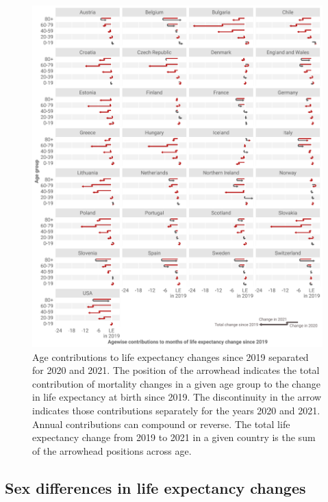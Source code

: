 \documentclass[12pt]{article}
\begin{document}
\begin{figure}[ht!]
    \centering
    \includegraphics{figure-2.pdf}
    \caption{Age contributions to life expectancy changes since 2019 separated for 2020 and 2021. The position of the arrowhead indicates the total contribution of mortality changes in a given age group to the change in life expectancy at birth since 2019. The discontinuity in the arrow indicates those contributions separately for the years 2020 and 2021. Annual contributions can compound or reverse. The total life expectancy change from 2019 to 2021 in a given country is the sum of the arrowhead positions across age.}
    \label{fig:figure-2}
\end{figure}

\subsection*{Sex differences in life expectancy changes}
\end{document}
